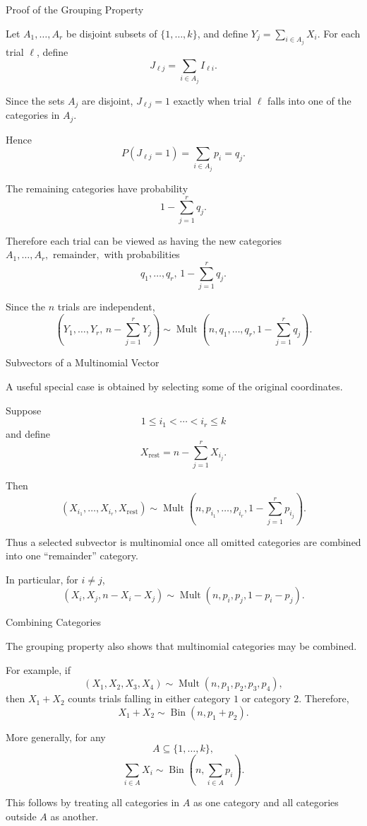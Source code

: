 \begin{frame}{Proof of the Grouping Property}

Let $A_1,\dots,A_r$ be disjoint subsets of $\{1,\dots,k\}$, and define $Y_j=\sum_{i\in A_j}X_i.$ For each trial $\ell$, define
\[
J_{\ell j}
=
\sum_{i\in A_j} I_{\ell i}.
\]

Since the sets $A_j$ are disjoint, $J_{\ell j}=1$ exactly when
trial $\ell$ falls into one of the categories in $A_j$.

Hence
\[
P(J_{\ell j}=1)
=
\sum_{i\in A_j}p_i
=
q_j.
\]

The remaining categories have probability
\[
1-\sum_{j=1}^r q_j.
\]

Therefore each trial can be viewed as having the new categories $A_1,\dots,A_r,\text{ remainder},
$ with probabilities
\[
q_1,\dots,q_r,\,
1-\sum_{j=1}^rq_j.
\]

Since the $n$ trials are independent,
\[
{
\left(
Y_1,\dots,Y_r,\,
n-\sum_{j=1}^rY_j
\right)
\sim
\operatorname{Mult}
\left(
n,q_1,\dots,q_r,
1-\sum_{j=1}^rq_j
\right).
}
\]

\end{frame}

\begin{frame}{Subvectors of a Multinomial Vector}

A useful special case is obtained by selecting some of the original
coordinates.

Suppose
\[
1\le i_1<\cdots<i_r\le k
\]
and define
\[
X_{\mathrm{rest}}
=
n-\sum_{j=1}^r X_{i_j}.
\]

Then
\[
\boxed{
\left(
X_{i_1},\dots,X_{i_r},X_{\mathrm{rest}}
\right)
\sim
\operatorname{Mult}
\left(
n,
p_{i_1},\dots,p_{i_r},
1-\sum_{j=1}^r p_{i_j}
\right).
}
\]

Thus a selected subvector is multinomial once all omitted categories
are combined into one ``remainder'' category.

In particular, for $i\neq j$,
\[
\boxed{
(X_i,X_j,n-X_i-X_j)
\sim
\operatorname{Mult}
(n,p_i,p_j,1-p_i-p_j).
}
\]

\end{frame}

\begin{frame}{Combining Categories}

The grouping property also shows that multinomial categories may be
combined.

For example, if
\[
(X_1,X_2,X_3,X_4)
\sim
\operatorname{Mult}(n,p_1,p_2,p_3,p_4),
\]
then $X_1+X_2$ counts trials falling in either category $1$ or category $2$. Therefore,
\[
\boxed{
X_1+X_2
\sim
\operatorname{Bin}(n,p_1+p_2).
}
\]

More generally, for any
\[
A\subseteq\{1,\dots,k\},
\]
\[
\boxed{
\sum_{i\in A}X_i
\sim
\operatorname{Bin}
\left(
n,\sum_{i\in A}p_i
\right).
}
\]

This follows by treating all categories in $A$ as one category and
all categories outside $A$ as another.

\end{frame}

